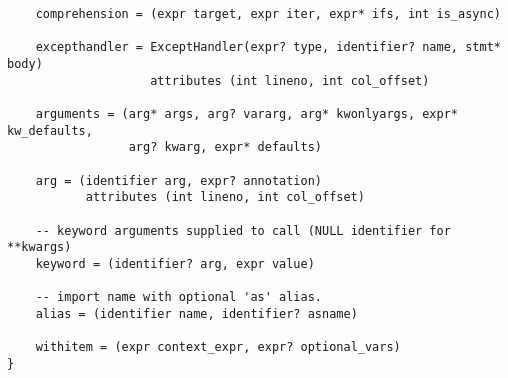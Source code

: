 \begin{verbatim}
    comprehension = (expr target, expr iter, expr* ifs, int is_async)

    excepthandler = ExceptHandler(expr? type, identifier? name, stmt* body)
                    attributes (int lineno, int col_offset)

    arguments = (arg* args, arg? vararg, arg* kwonlyargs, expr* kw_defaults,
                 arg? kwarg, expr* defaults)

    arg = (identifier arg, expr? annotation)
           attributes (int lineno, int col_offset)

    -- keyword arguments supplied to call (NULL identifier for **kwargs)
    keyword = (identifier? arg, expr value)

    -- import name with optional 'as' alias.
    alias = (identifier name, identifier? asname)

    withitem = (expr context_expr, expr? optional_vars)
}

\end{verbatim}